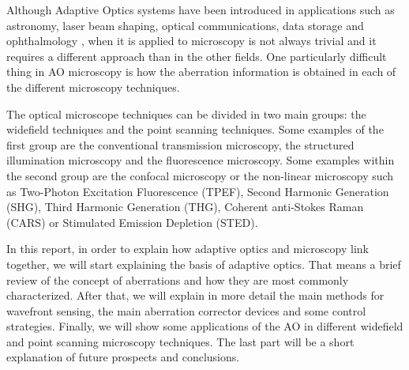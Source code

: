 Although Adaptive Optics systems have been introduced in applications such as astronomy, laser beam shaping, optical communications, data storage and ophthalmology \cite{AOM_biomedical}, when it is applied to microscopy is not always trivial and it requires a different approach than in the other fields. One particularly difficult thing in AO microscopy is how the aberration information is obtained in each of the different microscopy techniques.

The optical microscope techniques can be divided in two main groups: the widefield techniques and the point scanning techniques. Some examples of the first group are the conventional transmission microscopy, the structured illumination microscopy and the fluorescence microscopy. Some examples within the second group are the confocal microscopy or the non-linear microscopy such as Two-Photon Excitation Fluorescence (TPEF), Second Harmonic Generation (SHG), Third Harmonic Generation (THG), Coherent anti-Stokes Raman (CARS) or Stimulated Emission Depletion (STED).  

In this report, in order to explain how adaptive optics and microscopy link together, we will start explaining the basis of adaptive optics. That means a brief review of the concept of aberrations and how they are most commonly characterized. After that, we will explain in more detail the main methods for wavefront sensing, the main aberration corrector devices and some control strategies. Finally, we will show some applications of the AO in different widefield and point scanning microscopy techniques. The last part will be a short explanation of future prospects and conclusions.       
